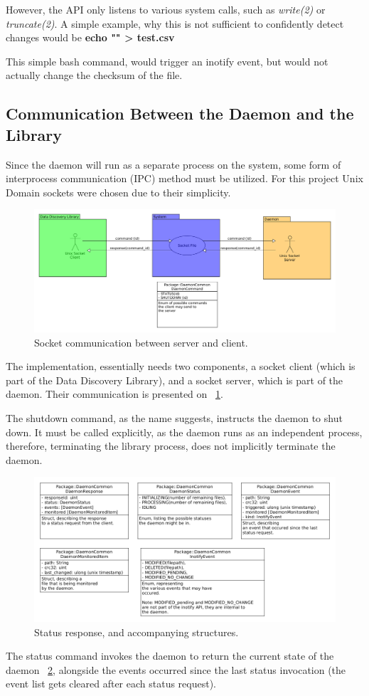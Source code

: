 However, the API only listens to various system calls, such as \textit{write(2)} or \textit{truncate(2)}.
A simple example, why this is not sufficient to confidently detect changes would be \textbf{echo "" > test.csv}

This simple bash command, would trigger an inotify event, but would not actually change the checksum of the file.

\subsection{Communication Between the Daemon and the Library}
Since the daemon will run as a separate process on the system, some form of interprocess communication (IPC) method
must be utilized.
For this project Unix Domain sockets were chosen due to their simplicity.

\begin{figure}[h]
    \centering
    \includegraphics[width=12cm]{figures/daemon/socket_communication}
    \caption{Socket communication between server and client.}
    \label{fig:daemon_fig_1}
\end{figure}


The implementation, essentially needs two components, a socket client (which is part of the Data Discovery Library),
and a socket server, which is part of the daemon.
Their communication is presented on ~\ref{fig:daemon_fig_1}.

The shutdown command, as the name suggests, instructs the daemon to shut down.
It must be called explicitly, as the daemon runs as an independent process, therefore,
terminating the library process, does not implicitly terminate the daemon.

\begin{figure}[h]
    \centering
    \includegraphics[width=12cm]{figures/daemon/daemon_response}
    \caption{Status response, and accompanying structures.}
    \label{fig:daemon_fig_2}
\end{figure}


The status command invokes the daemon to return the current state of the daemon ~\ref{fig:daemon_fig_2}, alongside the events occurred since the
last status invocation (the event list gets cleared after each status request).
